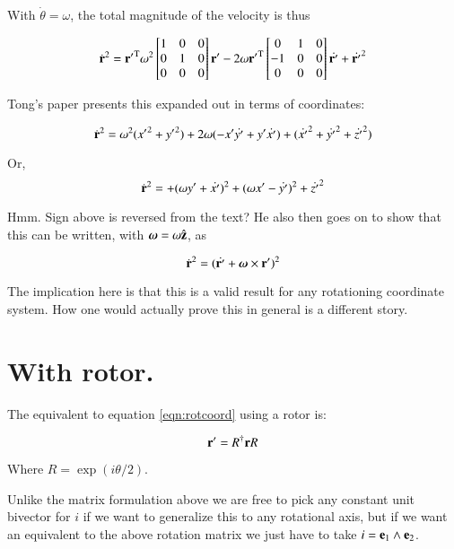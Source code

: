 \documentclass{article}      %
\newcommand{\dt}[1]{\dot{#1}}
\newcommand{\transpose}[1]{{#1}^{\text{T}}}
\begin{document}
With $\dt{\theta} = \omega$, the total magnitude of the velocity is thus

\[
\dt{\Br}^2 = 
\transpose{\Br'} 
\omega^2
\begin{bmatrix}
1 & 0 & 0 \\
0 & 1 & 0 \\
0 & 0 & 0 \\
\end{bmatrix}
\Br'
-2 \omega \transpose{{\Br'}} 
\begin{bmatrix}
0 & 1 & 0 \\
-1 & 0 & 0 \\
0 & 0 & 0 \\
\end{bmatrix}
\dt{\Br'}
+ {\dt{\Br'}}^2
\]

Tong's paper presents this expanded out in terms of coordinates:

\[
\dt{\Br}^2 = 
\omega^2( {x'}^{2} + {y'}^{2} )
+ 2 \omega ( -x' \dt{y'} +y' \dt{x'} )
+ ( \dt{x'}^{2} + \dt{y'}^{2} + \dt{z'}^{2} )
\]

Or,
\begin{equation}\label{eqn:vmagwithmatrix}
\dt{\Br}^2 = 
+( \omega y' + \dt{x'} )^2 
+( \omega x' - \dt{y'} )^2 
+ \dt{z'}^2 
\end{equation}

Hmm.  Sign above is reversed from the text?  He also then goes on to
show that this can be written, with $\boldsymbol{\omega} = \omega \hat{\mathbf{z}}$, as 

\[
\dt{\Br}^2 = ( \dt{\Br'} + \Bomega \cross \Br')^2
\]

The implication here is that this is a valid result for any rotationing
coordinate system.   How one would actually prove this in general is 
a different story.

\section{ With rotor. }

The equivalent to equation \ref{eqn:rotcoord} using a rotor is:

\begin{equation}
\mathbf{r}' = R^\dagger \mathbf{r} R
\end{equation}

Where $R = \exp( i\theta/2 )$.

Unlike the 
matrix formulation above we are free to pick any constant unit bivector
for $i$ if we want to generalize this to any rotational axis, but if we
want an equivalent to the above rotation matrix we just have to take
$i = \mathbf{e}_1 \wedge \mathbf{e}_2$.
\end{document}
